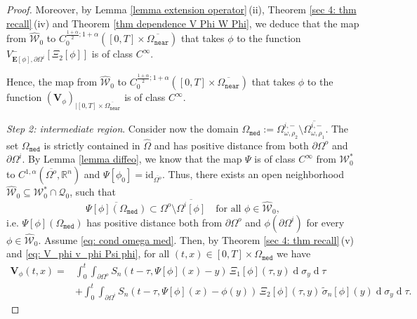 \documentclass[11pt,reqno,a4paper]{amsart}
\theoremstyle{plain}
\theoremstyle{definition}
\newcommand{\R}{\mathbb{R}}
\renewcommand{\d}[1]{\ensuremath{\operatorname{d}\!{#1}}}
\begin{document}
\begin{proof}
    Moreover, by Lemma \ref{lemma extension operator}\,(ii), Theorem \ref{sec 4: thm recall}\,(iv) and Theorem \ref{thm dependence V Phi W Phi}, we deduce that the map from $\widehat{\mathcal{W}}_0$ to $ C_0^{\frac{1+\alpha}{2}; 1+\alpha}([0, T] \times \overline{\Omega_{\mathtt{near}}})$ that takes $\phi$ to the function $V^-_{\mathbf{E}[\phi], \partial \Omega^i}[\Xi_2[\phi]]$ is of class $C^\infty$.

    Hence, the map from $\widehat{\mathcal{W}}_0$ to $ C_0^{\frac{1+\alpha}{2}; 1+\alpha}([0, T] \times \overline{\Omega_{\mathtt{near}}})$ that takes $\phi$ to the function $(\mathbf{V}_\phi)_{|[0, T] \times \overline{\Omega_{\mathtt{near}}}}$ is of class $C^{\infty}$.

    \smallskip
    \textit{Step 2: intermediate region}. Consider now the domain $\Omega_{\mathtt{med}}:= \Omega^{i,-}_{\omega,\rho_2} \setminus \overline{\Omega^{i,-}_{\omega,\rho_1}}$. The set $\Omega_{\mathtt{med}}$ is strictly contained in $\widehat\Omega$ and has positive distance from both $\partial\Omega^o$ and $\partial\Omega^i$. By Lemma \ref{lemma diffeo}, we know that the map $\Psi$ is of class $C^\infty$ from $\mathcal{W}^\ast_0$ to $C^{1,\alpha}(\overline{\Omega^o},\R^n)$ and $\Psi[\phi_0] = \mathrm{id}_{\overline{\Omega^o}}$. Thus, there exists an open neighborhood $\widehat{\mathcal{W}}_0 \subseteq \mathcal{W}^\ast_0 \cap \mathcal{Q}_0$, such that 
    \begin{equation}\label{eq: cond omega med}
    \overline{\Psi[\phi](\Omega_{\mathtt{med}})} \subset \Omega^o \setminus \overline{\Omega^i[\phi]} \quad \text{for all } \phi \in \widehat{\mathcal{W}}_0,
    \end{equation}
    i.e. $\Psi[\phi](\Omega_{\mathtt{med}})$ has positive distance both from $\partial\Omega^o$ and $\phi(\partial\Omega^i)$ for every $\phi \in \widehat{\mathcal{W}}_0$. Assume \eqref{eq: cond omega med}. Then, by Theorem \ref{sec 4: thm recall}\,(v) and \eqref{eq: V_phi v_phi Psi phi}, for all $(t,x) \in [0,T]\times \Omega_{\mathtt{med}}$ we have 
    \begin{equation}\label{eq: V phi on omega med}
    \begin{split}
    \mathbf{V}_\phi(t,x) = & \int_0^t \int_{\partial\Omega^o} S_n (t-\tau,\Psi[\phi](x) - y) \,\Xi_1[\phi](\tau,y) \d \sigma_y \d \tau
    \\
    & + \int_0^t \int_{\partial\Omega^i} S_n (t-\tau,\Psi[\phi](x) - \phi(y) ) \, \Xi_2[\phi](\tau,y)\, \tilde{\sigma}_n[\phi](y) \d \sigma_y \d \tau.
    \end{split}
    \end{equation}


\end{proof}
\end{document}
